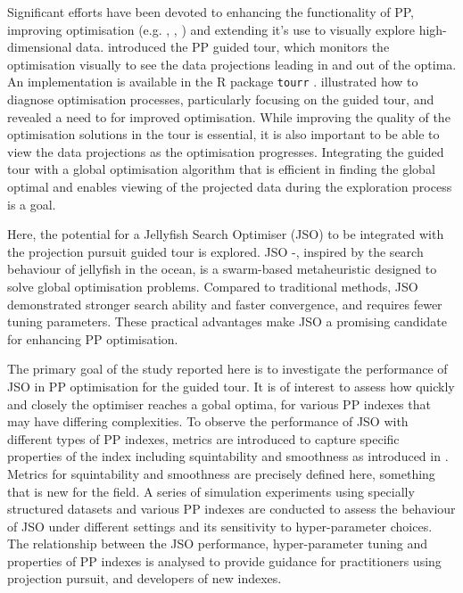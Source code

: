 \documentclass[
  number,
  preprint,
  3p]{elsarticle}
\begin{document}
Significant efforts have been devoted to enhancing the functionality of
PP, improving optimisation (e.g. \citet{posse1995},
\citet{marie-sainte2010}, \citet{grochowski2011}) and extending it's use
to visually explore high-dimensional data. \citet{cook1995grand}
introduced the PP guided tour, which monitors the optimisation visually
to see the data projections leading in and out of the optima. An
implementation is available in the R \citep{R} package \texttt{tourr}
\citep{tourr}. \citet{RJ-2021-105} illustrated how to diagnose
optimisation processes, particularly focusing on the guided tour, and
revealed a need to for improved optimisation. While improving the
quality of the optimisation solutions in the tour is essential, it is
also important to be able to view the data projections as the
optimisation progresses. Integrating the guided tour with a global
optimisation algorithm that is efficient in finding the global optimal
and enables viewing of the projected data during the exploration process
is a goal.

Here, the potential for a Jellyfish Search Optimiser (JSO) to be
integrated with the projection pursuit guided tour is explored. JSO
\citep{chou_novel_2021} -\citep{rajwar_exhaustive_2023}, inspired by the
search behaviour of jellyfish in the ocean, is a swarm-based
metaheuristic designed to solve global optimisation problems. Compared
to traditional methods, JSO demonstrated stronger search ability and
faster convergence, and requires fewer tuning parameters. These
practical advantages make JSO a promising candidate for enhancing PP
optimisation.

The primary goal of the study reported here is to investigate the
performance of JSO in PP optimisation for the guided tour. It is of
interest to assess how quickly and closely the optimiser reaches a gobal
optima, for various PP indexes that may have differing complexities. To
observe the performance of JSO with different types of PP indexes,
metrics are introduced to capture specific properties of the index
including squintability and smoothness as introduced in
\citet{laa_using_2020}. Metrics for squintability and smoothness are
precisely defined here, something that is new for the field. A series of
simulation experiments using specially structured datasets and various
PP indexes are conducted to assess the behaviour of JSO under different
settings and its sensitivity to hyper-parameter choices. The
relationship between the JSO performance, hyper-parameter tuning and
properties of PP indexes is analysed to provide guidance for
practitioners using projection pursuit, and developers of new indexes.
\end{document}

